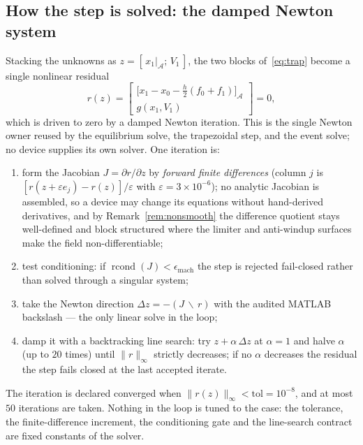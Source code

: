 \documentclass[12pt,a4paper]{article}
\theoremstyle{remark}
\begin{document}
\subsection{How the step is solved: the damped Newton system}\label{sec:ts-newton}
Stacking the unknowns as $z=[\,x_1|_{\mathcal{A}};\,V_1\,]$, the two blocks
of~\eqref{eq:trap} become a single nonlinear residual
\begin{equation}
  r(z)=\begin{bmatrix} \bigl[x_1-x_0-\tfrac{h}{2}(f_0+f_1)\bigr]_{\mathcal{A}}\\[2pt]
       g(x_1,V_1)\end{bmatrix}=0,
  \label{eq:resid}
\end{equation}
which is driven to zero by a damped Newton iteration. This is the single Newton
owner reused by the equilibrium solve, the trapezoidal step, and the event
solve; no device supplies its own solver. One iteration is:
\begin{enumerate}\itemsep2pt
  \item form the Jacobian $J=\partial r/\partial z$ by \emph{forward finite
        differences} (column $j$ is $[r(z+\varepsilon e_j)-r(z)]/\varepsilon$
        with $\varepsilon=3\times10^{-6}$); no analytic Jacobian is assembled,
        so a device may change its equations without hand-derived derivatives,
        and by Remark~\ref{rem:nonsmooth} the difference quotient stays
        well-defined and block structured where the limiter and anti-windup
        surfaces make the field non-differentiable;
  \item test conditioning: if $\operatorname{rcond}(J)<\epsilon_{\mathrm{mach}}$
        the step is rejected fail-closed rather than solved through a singular
        system;
  \item take the Newton direction $\Delta z=-(J\,\backslash\,r)$ with the
        audited MATLAB backslash --- the only linear solve in the loop;
  \item damp it with a backtracking line search: try $z+\alpha\,\Delta z$ at
        $\alpha=1$ and halve $\alpha$ (up to $20$ times) until
        $\lVert r\rVert_\infty$ strictly decreases; if no $\alpha$ decreases the
        residual the step fails closed at the last accepted iterate.
\end{enumerate}
The iteration is declared converged when
$\lVert r(z)\rVert_\infty<\mathrm{tol}=10^{-8}$, and at most $50$ iterations are
taken. Nothing in the loop is tuned to the case: the tolerance, the
finite-difference increment, the conditioning gate and the line-search contract
are fixed constants of the solver.
\end{document}
